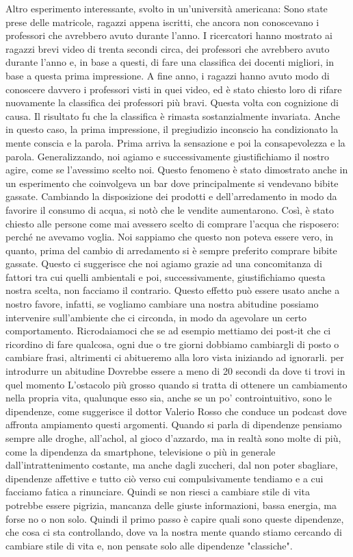 \documentclass[12pt]{book} %
\begin{document}
Altro esperimento interessante, svolto in un'università americana: Sono state prese delle
matricole, ragazzi appena iscritti, che ancora non conoscevano i professori che avrebbero avuto durante
l'anno. I ricercatori hanno mostrato ai ragazzi brevi video di trenta secondi circa, dei
professori che avrebbero avuto durante l'anno e, in base a questi, di fare una classifica dei
docenti migliori, in base a questa prima impressione. A fine anno, i ragazzi hanno avuto modo di conoscere davvero i
professori visti in quei video, ed è stato chiesto loro di rifare nuovamente la classifica dei professori più bravi.
Questa volta con cognizione di causa. Il risultato fu che la classifica è rimasta sostanzialmente invariata. Anche in
questo caso, la prima impressione, il pregiudizio inconscio ha condizionato la mente conscia e la parola. Prima arriva
la sensazione e poi la consapevolezza e la parola.
Generalizzando, noi agiamo e successivamente giustifichiamo il nostro agire, come se l'avessimo
scelto noi. Questo fenomeno è stato dimostrato anche in un esperimento che coinvolgeva un bar dove principalmente si
vendevano bibite gassate. Cambiando la disposizione dei prodotti e dell'arredamento in modo da
favorire il consumo di acqua, si notò che le vendite aumentarono. Così, è stato chiesto alle persone come mai avessero
scelto di comprare l'acqua che risposero: perché ne avevamo voglia. Noi sappiamo che questo non
poteva essere vero, in quanto, prima del cambio di arredamento si è sempre preferito comprare bibite gassate. Questo ci
suggerisce che noi agiamo grazie ad una concomitanza di fattori tra cui quelli ambientali e poi, successivamente,
giustifichiamo questa nostra scelta, non facciamo il contrario. Questo effetto può essere usato anche a nostro favore,
infatti, se vogliamo cambiare una nostra abitudine possiamo intervenire sull'ambiente che ci
circonda, in modo da agevolare un certo comportamento.
Ricrodaiamoci che se ad esempio mettiamo dei post-it che ci ricordino di fare qualcosa, ogni due o tre giorni dobbiamo cambiargli di posto o cambiare frasi, altrimenti ci abitueremo alla loro vista iniziando ad ignorarli.
per introdurre un abitudine Dovrebbe essere a meno di 20 secondi da dove ti trovi
in quel momento
L'ostacolo più grosso quando si tratta di ottenere un cambiamento nella propria vita, qualunque esso sia, anche se un po' controintuitivo, sono le dipendenze, come suggerisce il dottor Valerio Rosso che conduce un podcast dove affronta ampiamento questi argomenti. Quando si parla di dipendenze pensiamo sempre alle droghe, all'achol, al gioco d'azzardo, ma in realtà sono molte di più, come la dipendenza da smartphone, televisione o più in generale dall'intrattenimento costante, ma anche dagli zuccheri, dal non poter sbagliare, dipendenze affettive e tutto ciò verso cui compulsivamente tendiamo e a cui facciamo fatica a rinunciare. Quindi se non riesci a cambiare stile di vita potrebbe essere pigrizia, mancanza delle giuste informazioni, bassa energia, ma forse no o non solo. Quindi il primo passo è capire quali sono queste dipendenze, che cosa ci sta controllando, dove va la nostra mente quando stiamo cercando di cambiare stile di vita e, non pensate solo alle dipendenze "classiche".
\end{document}
